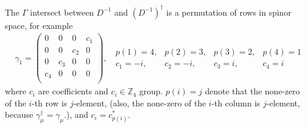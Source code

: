 The $\Gamma$ intersect between $D^{-1}$ and $\left(D^{-1}\right)^{\dagger}$ is a permutation of rows in spinor space, for example
\begin{equation}
\begin{split}
&\gamma _1=\left(\begin{array}{cccc}
0 & 0 & 0 & c_1 \\
0 & 0 & c_2 & 0 \\
0 & c_3 & 0 & 0 \\
c_4 & 0 & 0 & 0 \\
\end{array}\right),\;\;\begin{array}{cccc} p(1)=4,&p(2)=3,&p(3)=2,&p(4)=1 \\ c_1=-i, & c_2=-i, &c_3=i, &c_4=i \end{array}
\end{split}
\end{equation}
where $c_i$ are coefficients and $c_i\in \mathbb{Z}_4$ group. $p(i)=j$ denote that the none-zero of the $i$-th row is $j$-element, (also, the none-zero of the $i$-th column is $j$-element, because $\gamma _{\mu}^{\dagger}=\gamma _{\mu}$.), and $c_i=c_{p(i)}^*$.

